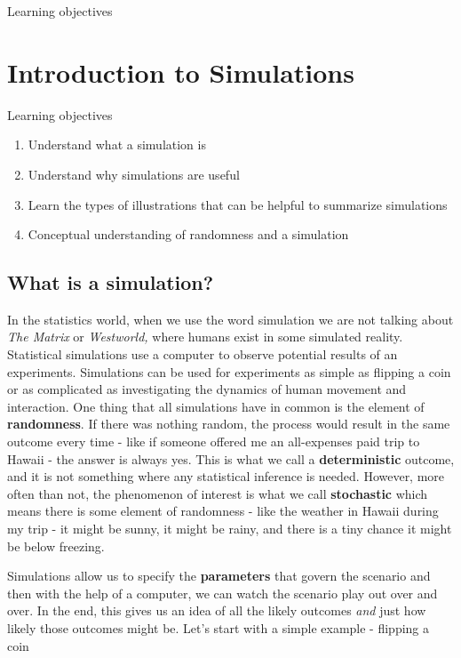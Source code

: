 \documentclass[
]{book}
\providecommand{\tightlist}{%
  \setlength{\itemsep}{0pt}\setlength{\parskip}{0pt}}
\theoremstyle{definition}
\theoremstyle{definition}
\theoremstyle{definition}
\theoremstyle{remark}
\begin{document}
Learning objectives

\hypertarget{ch12}{%
\chapter{Introduction to Simulations}\label{ch12}}

Learning objectives

\begin{enumerate}
\def\labelenumi{\arabic{enumi}.}
\tightlist
\item
  Understand what a simulation is
\item
  Understand why simulations are useful
\item
  Learn the types of illustrations that can be helpful to summarize simulations
\item
  Conceptual understanding of randomness and a simulation
\end{enumerate}

\hypertarget{ch12_s1}{%
\section{What is a simulation?}\label{ch12_s1}}

In the statistics world, when we use the word simulation we are not talking about
\emph{The Matrix} or \emph{Westworld,} where humans exist in some simulated reality. Statistical simulations
use a computer to observe potential results of an experiments. Simulations can be used
for experiments as simple as flipping a coin or as complicated as investigating the dynamics of human
movement and interaction. One thing that all simulations have in common is the element
of \textbf{randomness}. If there was nothing random, the process would result in the same
outcome every time - like if someone offered me an all-expenses paid trip to Hawaii - the
answer is always yes. This is what we call a \textbf{deterministic} outcome, and it is not
something where any statistical inference is needed. However, more often than not,
the phenomenon of interest is what we call \textbf{stochastic} which means there is
some element of randomness - like the weather in Hawaii during my trip - it might
be sunny, it might be rainy, and there is a tiny chance it might be below freezing.

Simulations allow us to specify the \textbf{parameters} that govern the scenario and then
with the help of a computer, we can watch the scenario play out over and over. In the end,
this gives us an idea of all the likely outcomes \emph{and} just how likely those outcomes might be.
Let's start with a simple example - flipping a coin
\end{document}
